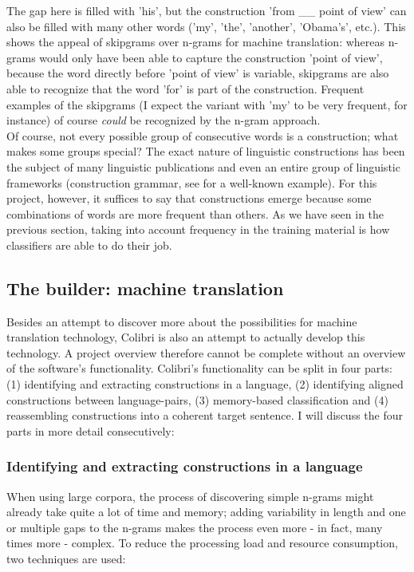 \documentclass[12pt]{article}
\begin{document}
The gap here is filled with 'his', but the construction 'from \_\_ point of view' can also be filled with many other words ('my', 'the', 'another', 'Obama's', etc.). This shows the appeal of skipgrams over n-grams for machine translation: whereas n-grams would only have been able to capture the construction 'point of view', because the word directly before 'point of view' is variable, skipgrams are also able to recognize that the word 'for' is part of the construction. Frequent examples of the skipgrams (I expect the variant with 'my' to be very frequent, for instance) of course \emph{could} be recognized by the n-gram approach.\\\indent
Of course, not every possible group of consecutive words is a construction; what makes some groups special? The exact nature of linguistic constructions has been the subject of many linguistic publications and even an entire group of linguistic frameworks (construction grammar, see \citet{goldberg95} for a well-known example). For this project, however, it suffices to say that constructions emerge because some combinations of words are more frequent than others. As we have seen in the previous section, taking into account frequency in the training material is how classifiers are able to do their job.

\subsection{The builder: machine translation} \label{builder}
Besides an attempt to discover more about the possibilities for machine translation technology, Colibri is also an attempt to actually develop this technology. A project overview therefore cannot be complete without an overview of the software's functionality. Colibri's functionality can be split in four parts: (1) identifying and extracting constructions in a language, (2) identifying aligned constructions between language-pairs, (3) memory-based classification and (4) reassembling constructions into a coherent target sentence. I will discuss the four parts in more detail consecutively:

\subsubsection{Identifying and extracting constructions in a language}
When using large corpora, the process of discovering simple n-grams might already take quite a lot of time and memory; adding variability in length and one or multiple gaps to the n-grams makes the process even more - in fact, many times more - complex. To reduce the processing load and resource consumption, two techniques are used:
\end{document}
